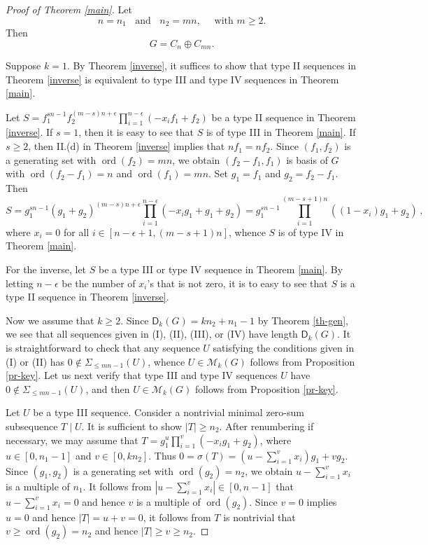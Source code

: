 \documentclass[11pt]{amsart}
\theoremstyle{definition}
\DeclareMathOperator{\ord}{ord}
\newcommand{\und}{\;\mbox{ and }\;}
\numberwithin{equation}{section}
\begin{document}
\begin{proof}[Proof of Theorem \ref{main}]
	Let $$n=n_1\;\und\; n_2=mn,\quad\mbox{ with $m\geq 2$}.$$
	Then $$G=C_n\oplus C_{mn}.$$ 
	
	Suppose $k=1$. By Theorem \ref{inverse}, it suffices to show that 
	type II sequences in Theorem \ref{inverse} is equivalent to type III and type IV sequences in Theorem \ref{main}.
	
	Let $S=f_1^{sn - 1} f_2^{(m-s)n+\epsilon}\prod_{i=1}^{n-\epsilon} ( -x_{i} f_1 +
	f_2)$ be a type II sequence in Theorem \ref{inverse}. 
	If $s=1$, then it is easy to see that $S$ is of type III in Theorem \ref{main}. If $s\ge 2$, then II.(d) in Theorem \ref{inverse} implies that $nf_1=nf_2$. Since $(f_1,f_2)$ is a generating set with $\ord(f_2)=mn$, we obtain  $(f_2-f_1,f_1)$ is basis of $G$ with $\ord(f_2-f_1)=n$ and $\ord(f_1)=mn$. Set $g_1=f_1$ and $g_2=f_2-f_1$. Then 
	\[
	S=g_1^{sn - 1} (g_1+g_2)^{(m-s)n+\epsilon}\prod_{i=1}^{n-\epsilon} ( -x_{i} g_1 +
	g_1+g_2)=g_1^{sn - 1} \prod_{i=1}^{(m-s+1)n} ( (1-x_{i}) g_1 + g_2)\,,
	\]
	where $x_i=0$ for all $i\in [n-\epsilon+1, (m-s+1)n]$,
	whence $S$ is of type IV in Theorem \ref{main}. 
	
	For the inverse, let $S$ be a type III or type IV sequence in Theorem \ref{main}. By letting $n-\epsilon$ be the number of $x_i$'s that is not zero, it is to easy to see that $S$ is a type II sequence in Theorem \ref{inverse}.
	 
	 
	 
	 
	 
	 Now we assume that $k\ge 2$.
	Since $\mathsf D_k(G)=kn_2+n_1-1$ by Theorem \ref{th-gen}, we see that all sequences given in (I), (II), (III), or (IV) have length $\mathsf D_k(G)$.
	It is straightforward to check that 
	any sequence $U$ satisfying the conditions given in (I) or (II) 
	has $0\not\in \Sigma_{\le mn-1}(U)$, whence $U\in \mathcal M_k(G)$ follows from Proposition \ref{pr-key}.
	 Let us next verify that type III and type IV sequences $U$ have $0\not\in \Sigma_{\le mn-1}(U)$, and then $U\in \mathcal M_k(G)$ follows from Proposition \ref{pr-key}.
	
	Let $U$ be a type III sequence. Consider a nontrivial minimal zero-sum subsequence $T\mid U$. It is sufficient to show $|T|\ge n_2$.
	 After renumbering if necessary, we may assume that $T=g_1^u\prod_{i=1}^{v}(-x_ig_1+g_2)$, where $u\in [0, n_1-1]$ and $v\in [0, kn_2]$. Thus $0=\sigma(T)=(u-\sum_{i=1}^vx_i)g_1+vg_2$.
	Since $(g_1,g_2)$ is a generating set with $\ord(g_2)=n_2$, we obtain $u-\sum_{i=1}^vx_i$ is a multiple of $n_1$. 
	 It follows from $|u-\sum_{i=1}^vx_i|\in [0, n-1]$ that $u-\sum_{i=1}^vx_i=0$ and hence $v$ is a multiple of $\ord(g_2)$. Since $v=0$ implies $u=0$ and hence $|T|=u+v=0$, it follows from $T$ is nontrivial that $v\ge \ord(g_2)=n_2$ and hence $|T|\ge v\ge n_2$.
	

\end{proof}
\end{document}
